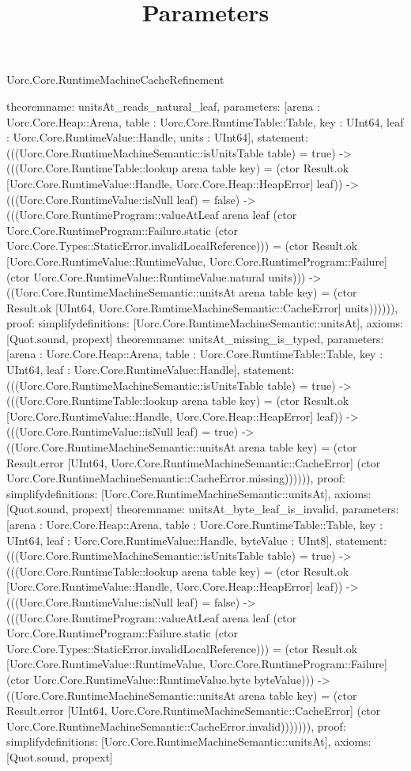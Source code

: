 \begin{lexlean}{Uorc.Core.RuntimeMachineCacheRefinement}
\title{Parameters}
\begin{semanticmodule}
theorem{name: unitsAt_reads_natural_leaf, parameters: [arena : Uorc.Core.Heap::Arena, table : Uorc.Core.RuntimeTable::Table, key : UInt64, leaf : Uorc.Core.RuntimeValue::Handle, units : UInt64], statement: (((Uorc.Core.RuntimeMachineSemantic::isUnitsTable table) = true) -> (((Uorc.Core.RuntimeTable::lookup arena table key) = (ctor Result.ok [Uorc.Core.RuntimeValue::Handle, Uorc.Core.Heap::HeapError] leaf)) -> (((Uorc.Core.RuntimeValue::isNull leaf) = false) -> (((Uorc.Core.RuntimeProgram::valueAtLeaf arena leaf (ctor Uorc.Core.RuntimeProgram::Failure.static (ctor Uorc.Core.Types::StaticError.invalidLocalReference))) = (ctor Result.ok [Uorc.Core.RuntimeValue::RuntimeValue, Uorc.Core.RuntimeProgram::Failure] (ctor Uorc.Core.RuntimeValue::RuntimeValue.natural units))) -> ((Uorc.Core.RuntimeMachineSemantic::unitsAt arena table key) = (ctor Result.ok [UInt64, Uorc.Core.RuntimeMachineSemantic::CacheError] units)))))), proof: simplify{definitions: [Uorc.Core.RuntimeMachineSemantic::unitsAt]}, axioms: [Quot.sound, propext]}
theorem{name: unitsAt_missing_is_typed, parameters: [arena : Uorc.Core.Heap::Arena, table : Uorc.Core.RuntimeTable::Table, key : UInt64, leaf : Uorc.Core.RuntimeValue::Handle], statement: (((Uorc.Core.RuntimeMachineSemantic::isUnitsTable table) = true) -> (((Uorc.Core.RuntimeTable::lookup arena table key) = (ctor Result.ok [Uorc.Core.RuntimeValue::Handle, Uorc.Core.Heap::HeapError] leaf)) -> (((Uorc.Core.RuntimeValue::isNull leaf) = true) -> ((Uorc.Core.RuntimeMachineSemantic::unitsAt arena table key) = (ctor Result.error [UInt64, Uorc.Core.RuntimeMachineSemantic::CacheError] (ctor Uorc.Core.RuntimeMachineSemantic::CacheError.missing)))))), proof: simplify{definitions: [Uorc.Core.RuntimeMachineSemantic::unitsAt]}, axioms: [Quot.sound, propext]}
theorem{name: unitsAt_byte_leaf_is_invalid, parameters: [arena : Uorc.Core.Heap::Arena, table : Uorc.Core.RuntimeTable::Table, key : UInt64, leaf : Uorc.Core.RuntimeValue::Handle, byteValue : UInt8], statement: (((Uorc.Core.RuntimeMachineSemantic::isUnitsTable table) = true) -> (((Uorc.Core.RuntimeTable::lookup arena table key) = (ctor Result.ok [Uorc.Core.RuntimeValue::Handle, Uorc.Core.Heap::HeapError] leaf)) -> (((Uorc.Core.RuntimeValue::isNull leaf) = false) -> (((Uorc.Core.RuntimeProgram::valueAtLeaf arena leaf (ctor Uorc.Core.RuntimeProgram::Failure.static (ctor Uorc.Core.Types::StaticError.invalidLocalReference))) = (ctor Result.ok [Uorc.Core.RuntimeValue::RuntimeValue, Uorc.Core.RuntimeProgram::Failure] (ctor Uorc.Core.RuntimeValue::RuntimeValue.byte byteValue))) -> ((Uorc.Core.RuntimeMachineSemantic::unitsAt arena table key) = (ctor Result.error [UInt64, Uorc.Core.RuntimeMachineSemantic::CacheError] (ctor Uorc.Core.RuntimeMachineSemantic::CacheError.invalid))))))), proof: simplify{definitions: [Uorc.Core.RuntimeMachineSemantic::unitsAt]}, axioms: [Quot.sound, propext]}

\end{semanticmodule}
\end{lexlean}
